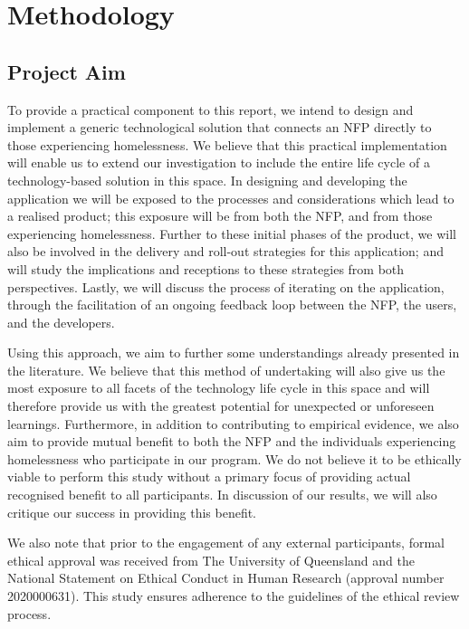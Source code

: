 \chapter{Methodology}

\section{Project Aim}

To provide a practical component to this report, we intend to design and implement a generic technological solution that connects an NFP directly to those experiencing homelessness. We believe that this practical implementation will enable us to extend our investigation to include the entire life cycle of a technology-based solution in this space. In designing and developing the application we will be exposed to the processes and considerations which lead to a realised product; this exposure will be from both the NFP, and from those experiencing homelessness. Further to these initial phases of the product, we will also be involved in the delivery and roll-out strategies for this application; and will study the implications and receptions to these strategies from both perspectives. Lastly, we will discuss the process of iterating on the application, through the facilitation of an ongoing feedback loop between the NFP, the users, and the developers.

Using this approach, we aim to further some understandings already presented in the literature. We believe that this method of undertaking will also give us the most exposure to all facets of the technology life cycle in this space and will therefore provide us with the greatest potential for unexpected or unforeseen learnings. Furthermore, in addition to contributing to empirical evidence, we also aim to provide mutual benefit to both the NFP and the individuals experiencing homelessness who participate in our program. We do not believe it to be ethically viable to perform this study without a primary focus of providing actual recognised benefit to all participants. In discussion of our results, we will also critique our success in providing this benefit.

We also note that prior to the engagement of any external participants, formal ethical approval was received from The University of Queensland and the National Statement on Ethical Conduct in Human Research (approval number 2020000631). This study ensures adherence to the guidelines of the ethical review process.

